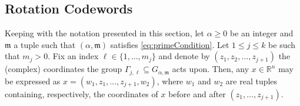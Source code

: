 \documentclass[10pt, reqno]{amsart}
\newcommand{\m}{\mathfrak{m}}
\numberwithin{equation}{section}
\theoremstyle{definition}
\theoremstyle{remark}
\theoremstyle{plain}
\begin{document}
	\subsection{Rotation Codewords}
	
	Keeping with the notation presented in this section, let $\alpha \ge 0$ be an integer and $\m$ a tuple such that $(\alpha,\m)$ satisfies \eqref{eq:primeCondition}. Let $1 \le j \le k$ be such that $m_j > 0$. Fix an index $\ell \in \{1,\dots,m_j\}$ and denote by $(z_1, z_2, \dots, z_{j+1})$ the (complex) coordinates the group $\Gamma_{j,\ell} \subseteq G_{\alpha,\m}$ acts upon. Then, any $x\in \mathbb{R}^n$ may be expressed as $x = (w_1, z_1, \dots, z_{j+1}, w_2)$, where $w_1$ and $w_2$ are real tuples containing, respectively, the coordinates of $x$ before and after $(z_1, \dots, z_{j+1})$.
	
\end{document}
